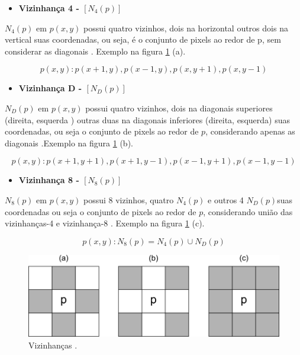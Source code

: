 \documentclass[
  brazilian,
]{book}
\providecommand{\tightlist}{%
  \setlength{\itemsep}{0pt}\setlength{\parskip}{0pt}}
\begin{document}
\begin{itemize}
\tightlist
\item
  \textbf{Vizinhança 4 - \(\left[N_4(p)\right]\)}
\end{itemize}

\(N_4(p)\) em \(p(x,y)\) possui quatro vizinhos, dois na horizontal outros dois na vertical suas coordenadas, ou seja, é o conjunto de pixels ao redor de p, sem considerar as diagonais \autocite[p.15]{thome2017}. Exemplo na figura \ref{fig:vizinhanca} (a).

\[p(x,y): p(x+1, y), p(x-1, y), p(x, y+1), p(x, y-1)\]

\begin{itemize}
\tightlist
\item
  \textbf{Vizinhança D - \(\left[N_D(p)\right]\)}
\end{itemize}

\(N_D(p)\) em \(p(x,y)\) possui quatro vizinhos, dois na diagonais superiores (direita, esquerda ) outras duas na diagonais inferiores (direita, esquerda) suas coordenadas, ou seja o conjunto de pixels ao redor de \(p\), considerando apenas as diagonais \autocite[p.15]{thome2017}.Exemplo na figura \ref{fig:vizinhanca} (b).

\[p(x,y): p(x+1,y+1), p(x+1, y-1), p(x-1, y+1), p(x-1, y-1)\]

\begin{itemize}
\tightlist
\item
  \textbf{Vizinhança 8 - \(\left[N_8(p)\right]\)}
\end{itemize}

\(N_8(p)\) em \(p(x,y)\) possui 8 vizinhos, quatro \(N_4(p)\) e outros 4 \(N_D(p)\)suas coordenadas ou seja o conjunto de pixels ao redor de \(p\), considerando união das vizinhanças-4 e vizinhança-8 \autocite[p.15]{thome2017}. Exemplo na figura \ref{fig:vizinhanca} (c).

\[p(x,y): N_8(p) = N_4(p) \cup N_D(p)\]



\begin{figure}

{\centering \includegraphics[width=0.55\linewidth]{imagens/02-formacao/vizinhanca} 

}

\caption{Vizinhanças \autocite{thome2017}.}\label{fig:vizinhanca}
\end{figure}
\end{document}
